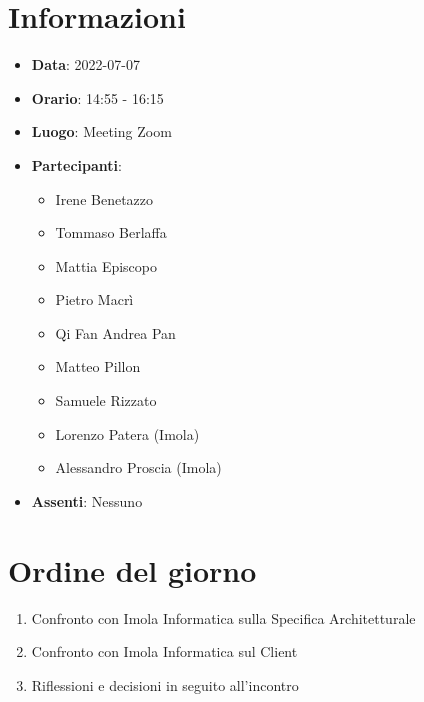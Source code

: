 \section{Informazioni}
	\begin{itemize}
		\item \textbf{Data}: 2022-07-07     %
		\item \textbf{Orario}: 14:55 - 16:15     %
		\item \textbf{Luogo}: Meeting Zoom
		\item \textbf{Partecipanti}:
		\begin{itemize}
			\item Irene Benetazzo
			\item Tommaso Berlaffa
			\item Mattia Episcopo
			\item Pietro Macrì
			\item Qi Fan Andrea Pan
			\item Matteo Pillon
			\item Samuele Rizzato
			\item Lorenzo Patera (Imola)
			\item Alessandro Proscia (Imola)
		\end{itemize}
        \item \textbf{Assenti}: Nessuno
	\end{itemize}
    
	\section{Ordine del giorno}
	\begin{enumerate}
		\item Confronto con Imola Informatica sulla Specifica Architetturale
		\item Confronto con Imola Informatica sul Client
    	\item Riflessioni e decisioni in seguito all'incontro
		
	\end{enumerate}
	\newpage